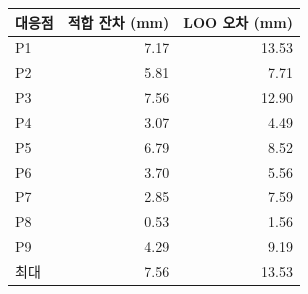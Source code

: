 \begin{tabular}{@{}lrr@{}}
\toprule 대응점 & 적합 잔차 (mm) & LOO 오차 (mm) \\
\midrule
P1 & 7.17 & 13.53 \\
P2 & 5.81 & 7.71 \\
P3 & 7.56 & 12.90 \\
P4 & 3.07 & 4.49 \\
P5 & 6.79 & 8.52 \\
P6 & 3.70 & 5.56 \\
P7 & 2.85 & 7.59 \\
P8 & 0.53 & 1.56 \\
P9 & 4.29 & 9.19 \\
\midrule
최대 & 7.56 & 13.53 \\
\bottomrule
\end{tabular}
